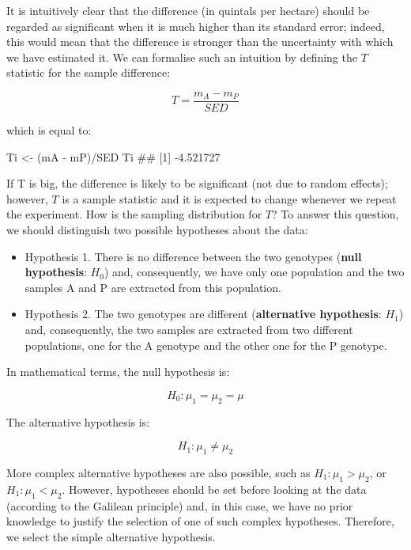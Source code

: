 \documentclass[a4paper,12pt,oneside]{book}
\providecommand{\tightlist}{%
  \setlength{\itemsep}{0pt}\setlength{\parskip}{0pt}}
\newenvironment{Shaded}{\begin{snugshade}}{\end{snugshade}}
\newcommand{\SpecialCharTok}[1]{#1}
\newcommand{\DocumentationTok}[1]{#1}
\newcommand{\OtherTok}[1]{#1}
\newcommand{\NormalTok}[1]{#1}
\begin{document}
It is intuitively clear that the difference (in quintals per hectare) should be regarded as significant when it is much higher than its standard error; indeed, this would mean that the difference is stronger than the uncertainty with which we have estimated it. We can formalise such an intuition by defining the \(T\) statistic for the sample difference:

\[T = \frac{m_A - m_P}{SED}\]

which is equal to:

\begin{Shaded}
\begin{Highlighting}[]
\NormalTok{Ti }\OtherTok{\textless{}{-}}\NormalTok{ (mA }\SpecialCharTok{{-}}\NormalTok{ mP)}\SpecialCharTok{/}\NormalTok{SED}
\NormalTok{Ti}
\DocumentationTok{\#\# [1] {-}4.521727}
\end{Highlighting}
\end{Shaded}

If T is big, the difference is likely to be significant (not due to random effects); however, \(T\) is a sample statistic and it is expected to change whenever we repeat the experiment. How is the sampling distribution for \(T\)? To answer this question, we should distinguish two possible hypotheses about the data:

\begin{itemize}
\tightlist
\item
  Hypothesis 1. There is no difference between the two genotypes (\textbf{null hypothesis}: \(H_0\)) and, consequently, we have only one population and the two samples A and P are extracted from this population.
\item
  Hypothesis 2. The two genotypes are different (\textbf{alternative hypothesis}: \(H_1\)) and, consequently, the two samples are extracted from two different populations, one for the A genotype and the other one for the P genotype.
\end{itemize}

In mathematical terms, the null hypothesis is:

\[H_0: \mu_1 = \mu_2 = \mu\]

The alternative hypothesis is:

\[H_1 :\mu_1  \neq \mu_2\]

More complex alternative hypotheses are also possible, such as \(H_1 :\mu _1 > \mu _2\), or \(H_1 :\mu _1 < \mu _2\). However, hypotheses should be set before looking at the data (according to the Galilean principle) and, in this case, we have no prior knowledge to justify the selection of one of such complex hypotheses. Therefore, we select the simple alternative hypothesis.
\end{document}
